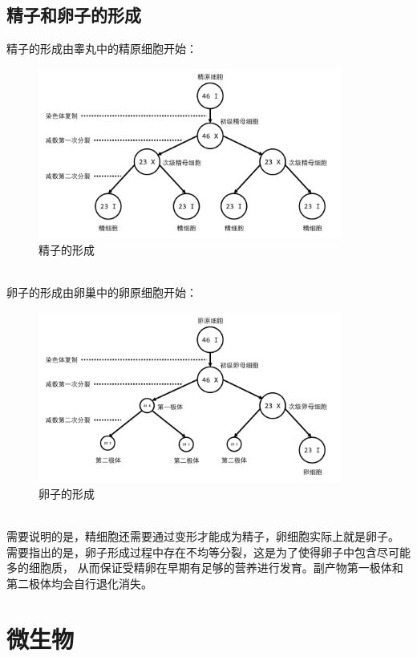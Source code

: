 \documentclass[UTF8]{ctexart}
\begin{document}
\subsection{精子和卵子的形成}
    精子的形成由睾丸中的精原细胞开始：
    \begin{figure}[h]
        \begin{center}
            \includegraphics[width=10cm]{BiologyImage/48.jpg}
            \caption{精子的形成}
        \end{center}
    \end{figure}\\
    卵子的形成由卵巢中的卵原细胞开始：
    \begin{figure}[h]
        \begin{center}
            \includegraphics[width=10cm]{BiologyImage/49.jpg}
            \caption{卵子的形成}
        \end{center}
    \end{figure} \\
    需要说明的是，精细胞还需要通过变形才能成为精子，卵细胞实际上就是卵子。\\[3mm]
    需要指出的是，卵子形成过程中存在不均等分裂，这是为了使得卵子中包含尽可能多的细胞质，
    从而保证受精卵在早期有足够的营养进行发育。副产物第一极体和第二极体均会自行退化消失。

\newpage

\section{微生物}
\end{document}
